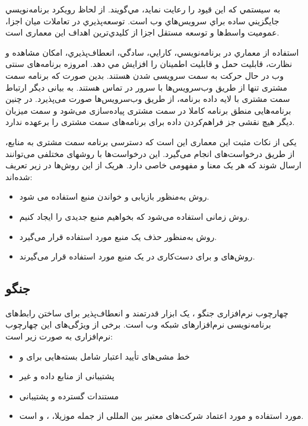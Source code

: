 {به سيستمي كه اين قيود را رعايت نمايد،  مي‌گويند. از لحاظ رويكرد برنامه‌نويسي  جايگزيني ساده براي سرويس‌هاي وب است. توسعه‌پذيري در تعاملات ميان اجزا، عموميت واسط‌ها و توسعه مستقل اجزا از كليدي‌ترين اهداف این معماری است.

استفاده از معماري  در برنامه‌نويسي، كارايي، سادگي، انعطاف‌پذيري، امكان مشاهده و نظارت، قابليت حمل و قابليت اطمينان را افزايش مي دهد.
امروزه برنامه‌های سنتی وب در حال حرکت به سمت سرویسی شدن هستند. بدین صورت که برنامه سمت مشتری تنها از طریق وب‌سرویس‌ها با سرور در تماس هستند. به بیانی دیگر ارتباط سمت مشتری با لایه داده برنامه، از طریق وب‌سرویس‌ها صورت می‌پذیرد. در چنین برنامه‌هایی منطق برنامه کاملا در سمت مشتری پیاده‌سازی می‌شود و سمت میزبان دیگر هیچ نقشی جز فراهم‌کردن داده برای برنامه‌های سمت مشتری را برعهده ندارد.
 
یکی از نکات مثبت این معماری این است که دسترسی برنامه سمت مشتری به منابع، از طریق درخواست‌های  انجام می‌گیرد. این درخواست‌ها با روشهای مختلفی می‌توانند ارسال شوند که هر یک معنا و مفهومی خاصی دارد. هریک از این روش‌ها در زیر تعریف شده‌اند:
\begin{itemize}
	\item روش  به‌منظور بازیابی و خواندن منبع استفاده می شود.
	\item روش  زمانی استفاده می‌شود که بخواهیم منبع جدیدی را ایجاد کنیم.
	\item روش  به‌منظور حذف یک منبع مورد استفاده قرار می‌گیرد.
	\item روش‌های  و  برای دست‌کاری در یک منبع مورد استفاده قرار می‌گیرند.
\end{itemize}


\subsection{جنگو }
چهارچوب نرم‌افزاری جنگو \cite{DjangoREST}، یک ابزار قدرتمند و انعطاف‌پذیر برای ساختن رابط‌های برنامه‌نویسی نرم‌افزارهای شبکه وب است.
برخی از ویژگی‌های این چهارچوب نرم‌افزاری به صورت زیر است:
\begin{itemize}
	\item خط مشی‌های تأیید اعتبار شامل بسته‌هایی برای  و 
	\item پشتیبانی از منابع داده  و غیر 
	\item مستندات گسترده و پشتیبانی 
	\item مورد استفاده و مورد اعتماد شرکت‌های معتبر بین المللی از جمله موزیلا، ،  و  است.
\end{itemize}


}
